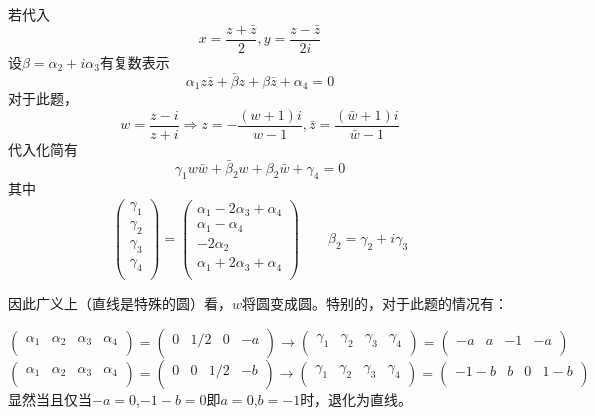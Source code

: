 \documentclass[a4paper]{ctexart}
\begin{document}
若代入
$$
    x=\frac{z+\bar{z}}{2},y=\frac{z-\bar{z}}{2i}
$$
设$\beta =\alpha _2+i\alpha _3$有复数表示
$$
    \alpha _1z\bar{z}+\bar{\beta}z+\beta \bar{z}+\alpha _4=0
$$
对于此题，
$$
    w=\frac{z-i}{z+i}\Rightarrow z=-\frac{\left( w+1 \right) i}{w-1},\bar{z}=\frac{\left( \bar{w}+1 \right) i}{\bar{w}-1}
$$
代入化简有
$$
    \gamma _1w\bar{w}+\bar{\beta}_2w+\beta _2\bar{w}+\gamma _4=0
$$
其中
$$
    \left( \begin{array}{c}
            \gamma _1 \\
            \gamma _2 \\
            \gamma _3 \\
            \gamma _4 \\
        \end{array} \right) =\left( \begin{array}{c}
            \alpha _1-2\alpha _3+\alpha _4 \\
            \alpha _1-\alpha _4            \\
            -2\alpha _2                    \\
            \alpha _1+2\alpha _3+\alpha _4 \\
        \end{array} \right) \qquad \beta _2=\gamma _2+i\gamma _3
$$

因此广义上（直线是特殊的圆）看，$w$将圆变成圆。特别的，对于此题的情况有：

$$
    \left( \begin{matrix}
            \alpha _1 & \alpha _2 & \alpha _3 & \alpha _4 \\
        \end{matrix} \right) =\left( \begin{matrix}
            0 & 1/2 & 0 & -a \\
        \end{matrix} \right) \rightarrow \left( \begin{matrix}
            \gamma _1 & \gamma _2 & \gamma _3 & \gamma _4 \\
        \end{matrix} \right) =\left( \begin{matrix}
            -a & a & -1 & -a \\
        \end{matrix} \right)
$$
$$
    \left( \begin{matrix}
            \alpha _1 & \alpha _2 & \alpha _3 & \alpha _4 \\
        \end{matrix} \right) =\left( \begin{matrix}
            0 & 0 & 1/2 & -b \\
        \end{matrix} \right) \rightarrow \left( \begin{matrix}
            \gamma _1 & \gamma _2 & \gamma _3 & \gamma _4 \\
        \end{matrix} \right) =\left( \begin{matrix}
            -1-b & b & 0 & 1-b \\
        \end{matrix} \right)
$$
显然当且仅当$-a=0$,$-1-b=0$即$a=0$,$b=-1$时，退化为直线。
\end{document}
